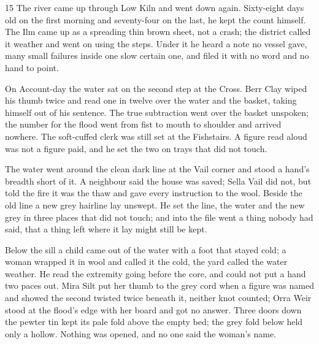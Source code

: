 






\CRtailpiece
\begin{CRchronicle}{15}
The river came up through Low Kiln and went down again. Sixty-eight days old on the first morning and seventy-four on the last, he kept the count himself. The Ilm came up as a spreading thin brown sheet, not a crash; the district called it weather and went on using the steps. Under it he heard a note no vessel gave, many small failures inside one slow certain one, and filed it with no word and no hand to point.

On Account-day the water sat on the second step at the Cross. Berr Clay wiped his thumb twice and read one in twelve over the water and the basket, taking himself out of his sentence. The true subtraction went over the basket unspoken; the number for the flood went from fist to mouth to shoulder and arrived nowhere. The soft-cuffed clerk was still set at the Fishstairs. A figure read aloud was not a figure paid, and he set the two on trays that did not touch.

The water went around the clean dark line at the Vail corner and stood a hand’s breadth short of it. A neighbour said the house was saved; Sella Vail did not, but told the fire it was the thaw and gave every instruction to the wool. Beside the old line a new grey hairline lay unswept. He set the line, the water and the new grey in three places that did not touch; and into the file went a thing nobody had said, that a thing left where it lay might still be kept.

Below the sill a child came out of the water with a foot that stayed cold; a woman wrapped it in wool and called it the cold, the yard called the water weather. He read the extremity going before the core, and could not put a hand two paces out. Mira Silt put her thumb to the grey cord when a figure was named and showed the second twisted twice beneath it, neither knot counted; Orra Weir stood at the flood’s edge with her board and got no answer. Three doors down the pewter tin kept its pale fold above the empty bed; the grey fold below held only a hollow. Nothing was opened, and no one said the woman’s name.


\end{CRchronicle}
